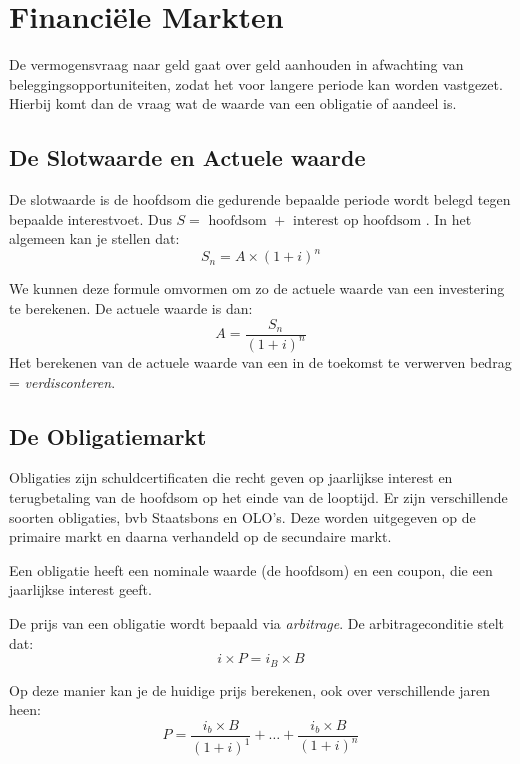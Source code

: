 \section{Financi\"ele Markten}
\label{sec:Financiele Markten}
De vermogensvraag naar geld gaat over geld aanhouden in afwachting van beleggingsopportuniteiten, zodat het voor langere periode kan worden vastgezet. Hierbij komt dan de vraag wat de waarde van een obligatie of aandeel is.


\subsection{De Slotwaarde en Actuele waarde}
\label{sub:De Slot- of Eindwaard}
De slotwaarde is de hoofdsom die gedurende bepaalde periode wordt belegd tegen bepaalde interestvoet. Dus $S = \text{ hoofdsom } + \text{ interest op hoofdsom }$. In het algemeen kan je stellen dat:
\begin{equation}
  S_n = A \times (1 + i)^n
\end{equation}

We kunnen deze formule omvormen om zo de actuele waarde van een investering te berekenen. De actuele waarde is dan:
\begin{equation}
  A = \frac{S_n}{(1 + i)^n}
\end{equation}
Het berekenen van de actuele waarde van een in de toekomst te verwerven bedrag = \textit{verdisconteren}.


\subsection{De Obligatiemarkt}
\label{sub:De Obligatiemarkt}
Obligaties zijn schuldcertificaten die recht geven op jaarlijkse interest en terugbetaling van de hoofdsom op het einde van de looptijd. Er zijn verschillende soorten obligaties, bvb Staatsbons en OLO's. Deze worden uitgegeven op de primaire markt en daarna verhandeld op de secundaire markt.

Een obligatie heeft een nominale waarde (de hoofdsom) en een coupon, die een jaarlijkse interest geeft.

De prijs van een obligatie wordt bepaald via \textit{arbitrage}. De arbitrageconditie stelt dat:
\begin{equation}
  i \times P = i_B \times B
\end{equation}

Op deze manier kan je de huidige prijs berekenen, ook over verschillende jaren heen:
\begin{equation}
  P = \frac{i_b \times B}{(1 + i)^1} + \dots + \frac{i_b \times B}{(1 + i)^n}
\end{equation}

